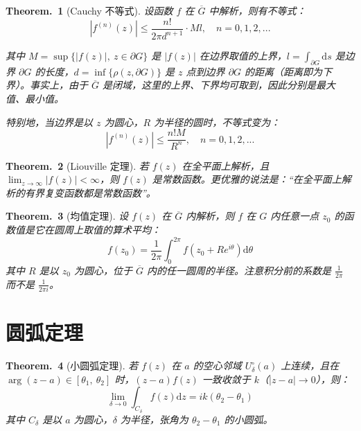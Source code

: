 \documentclass[UTF8]{report}
\theoremstyle{MyLineTheoremStyle} %
\newtheorem{LineTheorem}{Theorem.\,}
\theoremstyle{MyBlockTheoremStyle} %
\newtheorem{BlockTheorem}[LineTheorem]{Theorem.\,} %
\theoremstyle{MySubsubsectionStyle} %
\begin{document}
\begin{BlockTheorem}[Cauchy 不等式]\label{Cauchy 不等式}
设函数 $f$ 在 $\overline{G}$ 中解析，则有不等式：
\begin{equation}
\left| f^{(n)}(z) \right| \leqslant \frac{n!}{2 \pi d^{n+1}}\cdot Ml ,\quad n = 0, 1, 2, ...
\end{equation}

其中 $M = \sup \{ | f(z) |,\ z \in \partial G \}$ 是 $| f(z) |$ 在边界取值的上界，$l = \int_{\partial G} \mathrm{d}s$ 是边界 $\partial G$ 的长度，$d = \inf \{ \rho(z, \partial G) \}$ 是 $z$ 点到边界 $\partial G$ 的距离（距离即为下界）。事实上，由于 $\overline{G}$ 是闭域，这里的上界、下界均可取到，因此分别是最大值、最小值。

特别地，当边界是以 $z$ 为圆心，$R$ 为半径的圆时，不等式变为：
\begin{equation}
\left| f^{(n)}(z) \right| \leqslant \frac{n! M}{ R^{n}} ,\quad n = 0, 1, 2, ...
\end{equation}
\end{BlockTheorem}

\begin{LineTheorem}[Liouville 定理]\label{Liouville 定理}
若 $f(z)$ 在全平面上解析，且 $\displaystyle \lim_{z \to \infty} | f(z) | < \infty$，则 $f(z)$ 是常数函数。更优雅的说法是：“在全平面上解析的有界复变函数都是常数函数”。
\end{LineTheorem}

\begin{BlockTheorem}[均值定理]\label{均值定理}
设 $f(z)$ 在 $\overline{G}$ 内解析，则 $f$ 在 $G$ 内任意一点 $z_0$ 的函数值是它在圆周上取值的算术平均：
\begin{equation}
f(z_0) = \frac{1}{2\pi} \int_{0}^{2\pi} f(z_0 + R e^{i\theta}) \mathrm{d}\theta
\end{equation} 
其中 $R$ 是以 $z_0$ 为圆心，位于 $\overline{G}$ 内的任一圆周的半径。注意积分前的系数是 $\frac{1}{2\pi}$ 而不是 $\frac{1}{2\pi i}$。
\end{BlockTheorem}




\section{圆弧定理}
\begin{BlockTheorem}[小圆弧定理]\label{小圆弧定理}
若 $f(z)$ 在 $a$ 的空心邻域 $U_{\delta}^\circ(a)$ 上连续，且在 $\arg (z - a) \in [\theta_1,\ \theta_2]$ 时，$(z-a)f(z)$ 一致收敛于 $k$（$| z -a |\to 0$），则：
\begin{equation}
\lim_{\delta \to 0} \int_{C_\delta} f(z)\mathrm{d}z = ik(\theta_2 - \theta_1)
\end{equation}
其中 $C_\delta$ 是以 $a$ 为圆心，$\delta$ 为半径，张角为 $\theta_2 - \theta_1$ 的小圆弧。
\end{BlockTheorem}
\end{document}
